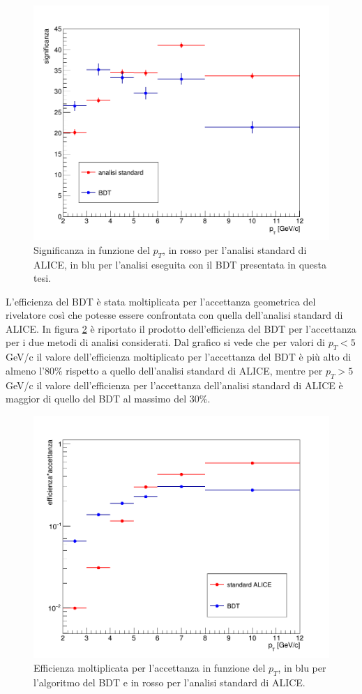     \begin{figure}[htbp] 
        \centering
        \includegraphics[width=0.8\linewidth]{AnalisiDati/significance.png}
        \caption{Significanza in funzione del $p_T$, in rosso per l'analisi standard di ALICE, in blu per l'analisi eseguita con il BDT presentata in questa tesi.}
        \label{fig:confr_sign}
    \end{figure}
  
L'efficienza del BDT \`e stata moltiplicata per l'accettanza geometrica del rivelatore così che potesse essere confrontata con quella dell'analisi standard di ALICE. %
In figura \ref{fig:eff_acc} \`e riportato il prodotto dell'efficienza del BDT per l'accettanza per i due metodi di analisi considerati. Dal grafico si vede che per valori di $p_T < 5$ GeV/c il valore dell'efficienza moltiplicato per l'accettanza del BDT \`e pi\`u alto di almeno l'$80\%$ rispetto a quello dell'analisi standard di ALICE, mentre per $p_T > 5$ GeV/c il valore dell'efficienza per l'accettanza dell'analisi standard di ALICE \`e maggior di quello del BDT al massimo del $30\%$.


    \begin{figure}[h] 
        \centering
        \includegraphics[width=0.8\linewidth]{AnalisiDati/eff_accett.png}
        \caption{Efficienza moltiplicata per l'accettanza in funzione del $p_T$, in blu per l'algoritmo del BDT e in rosso per l'analisi standard di ALICE.}
        \label{fig:eff_acc}
    \end{figure}

